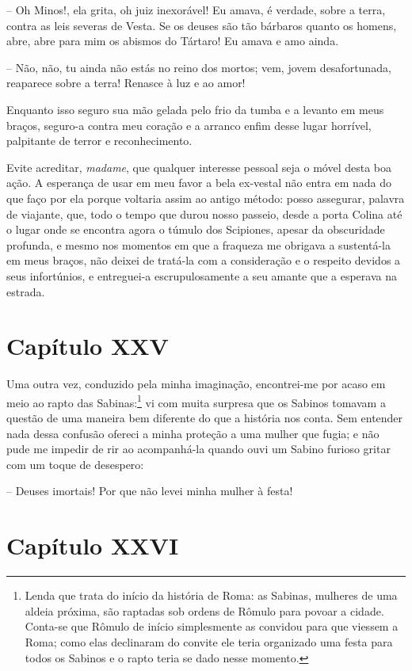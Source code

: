 -- Oh Minos!, ela grita, oh juiz inexorável! Eu amava, é verdade,
sobre a terra, contra as leis severas de Vesta. Se os deuses são tão
bárbaros quanto os homens, abre, abre para mim os abismos do Tártaro!
Eu amava e amo ainda. 

-- Não, não, tu ainda não estás no reino dos mortos; vem, jovem
desafortunada, reaparece sobre a terra! Renasce à luz e ao amor! 

Enquanto isso seguro sua mão gelada pelo frio da tumba e a levanto em
meus braços, seguro-a contra meu coração e a arranco enfim desse lugar
horrível, palpitante de terror e reconhecimento. 

Evite acreditar, \textit{madame}, que qualquer interesse pessoal seja o
móvel desta boa ação. A esperança de usar em meu favor a bela ex-vestal
não entra em nada do que faço por ela porque voltaria assim ao antigo
método: posso assegurar, palavra de viajante, que, todo o tempo que
durou nosso passeio, desde a porta Colina até o lugar onde se encontra
agora o túmulo dos Scipiones, apesar da obscuridade profunda, e mesmo
nos momentos em que a fraqueza me obrigava a sustentá-la em meus
braços, não deixei de tratá-la com a consideração e o respeito devidos
a seus infortúnios, e entreguei-a escrupulosamente a seu amante que a
esperava na estrada.

\section*{Capítulo XXV}

 Uma outra vez, conduzido pela minha imaginação, encontrei-me por acaso
em meio ao rapto das Sabinas:\footnote{ Lenda que trata do início da
história de Roma: as Sabinas, mulheres de uma aldeia próxima, são
raptadas sob ordens de Rômulo para povoar a cidade. Conta-se que Rômulo
de início simplesmente as convidou para que viessem a Roma; como elas
declinaram do convite ele teria organizado uma festa para todos os
Sabinos e o rapto teria se dado nesse momento.} vi com muita surpresa
que os Sabinos tomavam a questão de uma maneira bem diferente do que a
história nos conta. Sem entender nada dessa confusão ofereci a minha
proteção a uma mulher que fugia; e não pude me impedir de rir ao
acompanhá-la quando ouvi um Sabino furioso gritar com um toque de
desespero: 

 -- Deuses imortais! Por que não levei minha mulher à festa!

\section*{Capítulo XXVI}

